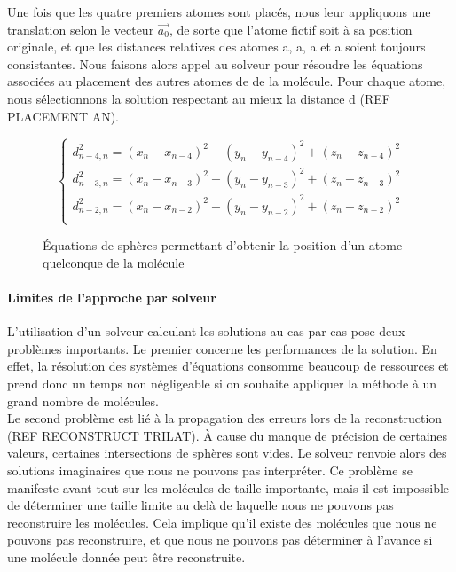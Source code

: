 \par Une fois que les quatre premiers atomes sont placés, nous leur appliquons une translation selon le vecteur $\vec{a_0}$, de sorte que l'atome fictif soit à sa position originale, et que les distances relatives des atomes a, a, a et a soient toujours consistantes. Nous faisons alors appel au solveur pour résoudre les équations associées au placement des autres atomes de de la molécule. Pour chaque atome, nous sélectionnons la solution respectant au mieux la distance d (REF PLACEMENT AN).


\begin{figure}[!h]
	\centering
	
	\[
	\left \{
   	\begin{array}{l}
      d_{n-4,n}^2=(x_n-x_{n-4})^2 + (y_n-y_{n-4})^2 + (z_n-z_{n-4})^2\\
	  d_{n-3,n}^2=(x_n-x_{n-3})^2 + (y_n-y_{n-3})^2 + (z_n-z_{n-3})^2\\
      d_{n-2,n}^2=(x_n-x_{n-2})^2 + (y_n-y_{n-2})^2 + (z_n-z_{n-2})^2\\
   	\end{array}
   	\right .
	\]
	
	\caption{Équations de sphères permettant d'obtenir la position d'un atome quelconque de la molécule}
\end{figure}

\paragraph{Limites de l'approche par solveur} L'utilisation d'un solveur calculant les solutions au cas par cas pose deux problèmes importants. Le premier concerne les performances de la solution. En effet, la résolution des systèmes d'équations consomme beaucoup de ressources et prend donc un temps non négligeable si on souhaite appliquer la méthode à un grand nombre de molécules.\\
Le second problème est lié à la propagation des erreurs lors de la reconstruction (REF RECONSTRUCT TRILAT). À cause du manque de précision de certaines valeurs, certaines intersections de sphères sont vides. Le solveur renvoie alors des solutions imaginaires que nous ne pouvons pas interpréter. Ce problème se manifeste avant tout sur les molécules de taille importante, mais il est impossible de déterminer une taille limite au delà de laquelle nous ne pouvons pas reconstruire les molécules. Cela implique qu'il existe des molécules que nous ne pouvons pas reconstruire, et que nous ne pouvons pas déterminer à l'avance si une molécule donnée peut être reconstruite.


